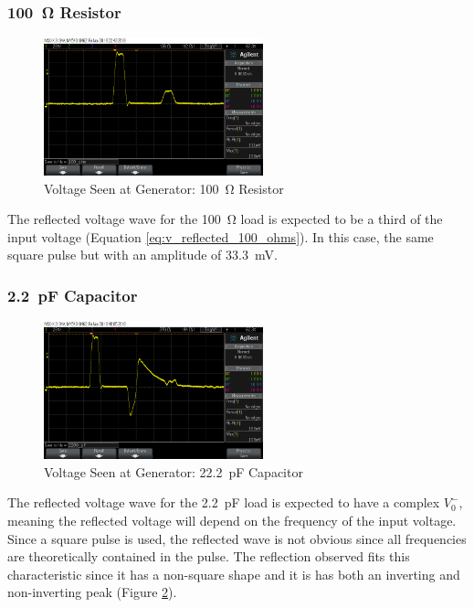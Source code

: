 \documentclass[conference]{IEEEtran}
\begin{document}
\subsubsection{\SI{100}{\ohm} Resistor}
\begin{figure}[H]
  \centering
  \includegraphics[width=2.5in]{./img/100_ohm.png}
  \caption{Voltage Seen at Generator: \SI{100}{\ohm} Resistor}
  \label{fig:100_ohm}
\end{figure}

The reflected voltage wave for the \SI{100}{\ohm} load is expected to be a third of the input
voltage (Equation \ref{eq:v_reflected_100_ohms}). In this case, the same square
pulse but with an amplitude of \SI{33.3}{\milli\volt}.

\subsubsection{\SI{2.2}{\pico\farad} Capacitor}
\begin{figure}[H]
  \centering
  \includegraphics[width=2.5in]{./img/2200_pf.png}
  \caption{Voltage Seen at Generator: \SI{22.2}{\pico\farad} Capacitor}
  \label{fig:2200_pf}
\end{figure}

The reflected voltage wave for the \SI{2.2}{\pico\farad} load is expected to
have a complex $V_0^-$, meaning the reflected voltage will depend on the
frequency of the input voltage. Since a square pulse is used, the reflected wave
is not obvious since all frequencies are theoretically contained in the pulse.
The reflection observed fits this characteristic since it has a non-square shape
and it is has both an inverting and non-inverting peak (Figure
\ref{fig:2200_pf}).
\end{document}
